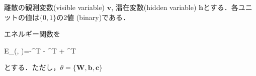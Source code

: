 離散の観測変数(visible variable) $\mathbf{v}$, 潜在変数(hidden variable) $\mathbf{h}$とする．各ユニットの値は$\{0, 1\}$の2値 (binary)である．

エネルギー関数を


E_\theta(, )=-^T  - ^T  + ^T  


とする．ただし，$\theta=\{\mathbf{W}, \mathbf{b}, \mathbf{c}\}$
